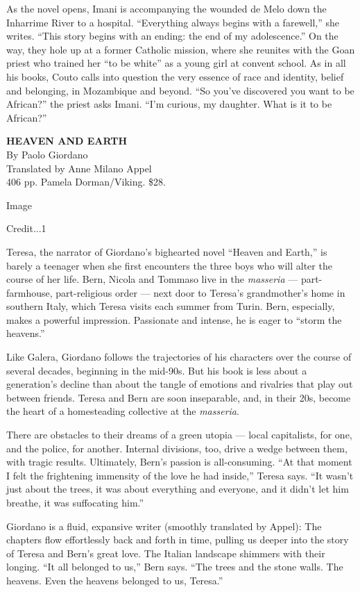 As the novel opens, Imani is accompanying the wounded de Melo down the
Inharrime River to a hospital. ``Everything always begins with a
farewell,'' she writes. ``This story begins with an ending: the end of
my adolescence.'' On the way, they hole up at a former Catholic mission,
where she reunites with the Goan priest who trained her ``to be white''
as a young girl at convent school. As in all his books, Couto calls into
question the very essence of race and identity, belief and belonging, in
Mozambique and beyond. ``So you've discovered you want to be African?''
the priest asks Imani. ``I'm curious, my daughter. What is it to be
African?''

\textbf{\textbf{HEAVEN AND EARTH}}\\
By Paolo Giordano\\
Translated by Anne Milano Appel\\
406 pp. Pamela Dorman/Viking. \$28.

Image

Credit...1

Teresa, the narrator of Giordano's bighearted novel ``Heaven and
Earth,'' is barely a teenager when she first encounters the three boys
who will alter the course of her life. Bern, Nicola and Tommaso live in
the \emph{masseria} --- part-farmhouse, part-religious order --- next
door to Teresa's grandmother's home in southern Italy, which Teresa
visits each summer from Turin. Bern, especially, makes a powerful
impression. Passionate and intense, he is eager to ``storm the
heavens.''

Like Galera, Giordano follows the trajectories of his characters over
the course of several decades, beginning in the mid-90s. But his book is
less about a generation's decline than about the tangle of emotions and
rivalries that play out between friends. Teresa and Bern are soon
inseparable, and, in their 20s, become the heart of a homesteading
collective at the \emph{masseria}.

There are obstacles to their dreams of a green utopia --- local
capitalists, for one, and the police, for another. Internal divisions,
too, drive a wedge between them, with tragic results. Ultimately, Bern's
passion is all-consuming. ``At that moment I felt the frightening
immensity of the love he had inside,'' Teresa says. ``It wasn't just
about the trees, it was about everything and everyone, and it didn't let
him breathe, it was suffocating him.''

Giordano is a fluid, expansive writer (smoothly translated by Appel):
The chapters flow effortlessly back and forth in time, pulling us deeper
into the story of Teresa and Bern's great love. The Italian landscape
shimmers with their longing. ``It all belonged to us,'' Bern says. ``The
trees and the stone walls. The heavens. Even the heavens belonged to us,
Teresa.''

